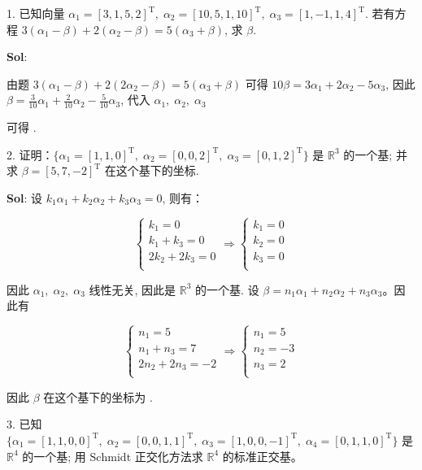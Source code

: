 
1. 已知向量 $\alpha_1=[3,1,5,2]^\text{T},\;\alpha_2=[10,5,1,10]^\text{T},\;\alpha_3=[1,-1,1,4]^\text{T}$. 若有方程 $3(\alpha_1-\beta)+2(\alpha_2-\beta)=5(\alpha_3+\beta)$, 求 $\beta$.

\textbf{Sol}: 

由题 $3(\alpha_1-\beta)+2(2\alpha_2-\beta)=5(\alpha_3+\beta)$ 
可得 $10\beta=3\alpha_1+2\alpha_2-5\alpha_3$, 
因此 $\beta=\frac{3}{10}\alpha_1+\frac{2}{10}\alpha_2-\frac{5}{10}\alpha_3$, 
代入 $\alpha_1,\;\alpha_2,\;\alpha_3$ 

可得 .


2. 证明：$\Big\{\alpha_1=[1,1,0]^\text{T},\;\alpha_2=[0,0,2]^\text{T},\;\alpha_3=[0,1,2]^\text{T}\Big\}$ 是 $\mathbb{R}^3$ 的一个基; 并求 $\beta=[5,7,-2]^\text{T}$ 在这个基下的坐标.

\textbf{Sol}: 设 $k_1\alpha_1+k_2\alpha_2+k_3\alpha_3=0$, 则有：

$$
\begin{cases}
k_1=0\\
k_1+k_3=0\\
2k_2+2k_3=0\\
\end{cases}
\Rightarrow 
\begin{cases}
    k_1=0\\
    k_2=0\\
    k_3=0\\
\end{cases}
$$

因此 $\alpha_1,\;\alpha_2,\;\alpha_3$ 线性无关, 因此是 $\mathbb{R}^3$ 的一个基. 设 $\beta=n_1\alpha_1+n_2\alpha_2+n_3\alpha_3$。因此有

$$
\begin{cases}
    n_1=5\\
    n_1+n_3=7\\
    2n_2+2n_3=-2\\
\end{cases}
\Rightarrow
\begin{cases}
    n_1=5\\
    n_2=-3\\
    n_3=2\\
\end{cases}
$$


因此 $\beta$ 在这个基下的坐标为 .

3. 已知 $\Big\{\alpha_1=[1,1,0,0]^\text{T},\;\alpha_2=[0,0,1,1]^\text{T},\;\alpha_3=[1,0,0,-1]^\text{T},\;\alpha_4=[0,1,1,0]^\text{T}\Big\}$ 是 $\mathbb{R}^4$ 的一个基; 用 $\text{Schmidt}$ 正交化方法求 $\mathbb{R}^4$ 的标准正交基。

